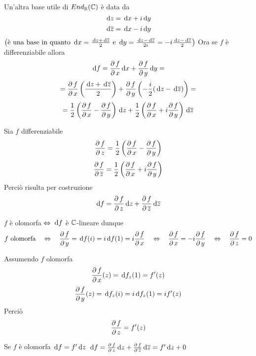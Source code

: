\begin{oss}Un'altra base utile di $End_\R(\C)$ \`e data da 
$$\di z = \di x + i \di y $$
$$\di \overline{z}=\di x - i \di y$$
$\tonde{ \text{\`e una base in quanto } \di x =\frac{\di z + \di \overline{z} }{2} \text{ e } \di y = \frac{\di z - \di \overline{z}}{2i}= -i \frac{\di z - \di \overline{z}}{2}}$
Ora se $f$ \`e differenziabile allora 
$$ \di f = \pr f x \di x + \pr f y \di y = $$ $$=\pr f x \tonde{\frac{\di z + \di \overline{z}}{2}}+\pr f y \tonde{ -\frac{i}{2}(\di z -\di \overline{z})} =$$
$$=\frac{1}{2}\tonde{\pr f x - \pr f y }\di z +\frac{1}{2}\tonde{\pr f x + i \pr f y }\di \overline{z} $$
\end{oss}
\begin{defn}Sia $f$ differenziabile 
$$\pr f z =\frac{1}{2}\tonde{\pr f x - \pr f y }$$
$$\pr f {\overline{z}} =\frac{1}{2}\tonde{\pr f x + i \pr f y }$$
Perci\`o risulta per costruzione
$$\di f = \pr f z \di z + \pr f {\overline{z}} \di \overline{z}$$
\end{defn}
\begin{oss}$f$ \`e olomorfa $\ses$ $\di f$ \`e $\C$-lineare dunque 
$$ f\text{ olomorfa} \quad \ses \quad \pr f y = \di f (i) = i \di f(1) =   i \pr f x  \quad \ses \quad \pr f x = - i \pr f y \quad \ses \quad \pr f z =0 $$
\end{oss}
\begin{oss}Assumendo $f$ olomorfa 
$$\pr f x (z) = \di f_z(1)= f'(z)$$
$$\pr f y (z) = \di f_z(i) = i \di f_z(1) = i f'(z)$$
Perci\`o 
$$\pr f z = f'(z)$$
\end{oss}
\begin{cor}Se $f$ \`e olomorfa $\di f = f' \di z$
\proof
$\di f = \pr f z \di z + \pr f {\overline{z}} \di \overline{z}= f' \di z + 0 $
\end{cor}
